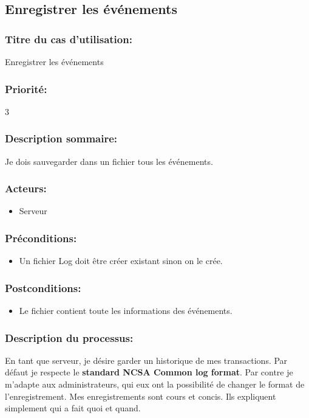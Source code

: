 \documentclass{scrreprt}
\begin{document}
\subsection{Enregistrer les événements}
\subsubsection{Titre du cas d'utilisation:} Enregistrer les événements
\subsubsection{Priorité:} 3
\subsubsection{Description sommaire:}Je dois sauvegarder dans un fichier tous les événements.
\subsubsection{Acteurs:}
\begin{itemize}
    \item Serveur
\end{itemize}
\subsubsection{Préconditions:}
\begin{itemize}
    \item  Un fichier Log doit être créer existant sinon on le crée.
\end{itemize} 
\subsubsection{Postconditions:}
\begin{itemize}
    \item  Le fichier contient toute les informations des événements.
\end{itemize} 
\subsubsection{Description du processus:}En tant que serveur, je désire garder un historique de mes transactions. Par
défaut je respecte le \textbf{standard NCSA Common log format}\cite{NCSA}. Par contre je m'adapte
aux administrateurs, qui eux ont la possibilité de changer le format de
l'enregistrement. Mes enregistrements sont cours et concis. Ils expliquent
simplement qui a fait quoi et quand.
\end{document}
